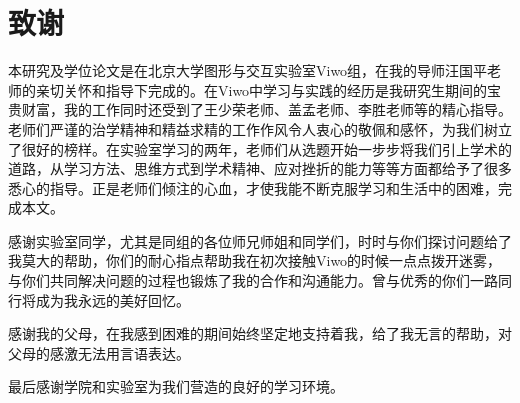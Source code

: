
\chapter{致谢}
本研究及学位论文是在北京大学图形与交互实验室Viwo组，在我的导师汪国平老师的亲切关怀和指导下完成的。在Viwo中学习与实践的经历是我研究生期间的宝贵财富，我的工作同时还受到了王少荣老师、盖孟老师、李胜老师等的精心指导。老师们严谨的治学精神和精益求精的工作作风令人衷心的敬佩和感怀，为我们树立了很好的榜样。在实验室学习的两年，老师们从选题开始一步步将我们引上学术的道路，从学习方法、思维方式到学术精神、应对挫折的能力等等方面都给予了很多悉心的指导。正是老师们倾注的心血，才使我能不断克服学习和生活中的困难，完成本文。\par
感谢实验室同学，尤其是同组的各位师兄师姐和同学们，时时与你们探讨问题给了我莫大的帮助，你们的耐心指点帮助我在初次接触Viwo的时候一点点拨开迷雾，与你们共同解决问题的过程也锻炼了我的合作和沟通能力。曾与优秀的你们一路同行将成为我永远的美好回忆。\par
感谢我的父母，在我感到困难的期间始终坚定地支持着我，给了我无言的帮助，对父母的感激无法用言语表达。\par
最后感谢学院和实验室为我们营造的良好的学习环境。

